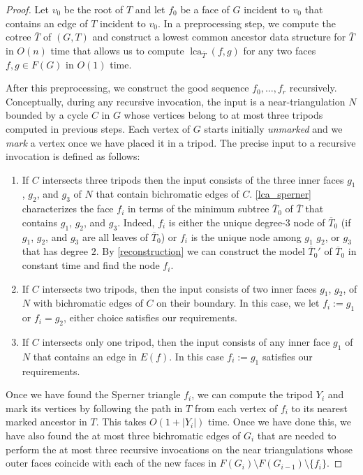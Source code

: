 \documentclass[a4paper,UKenglish,autoref]{lipics-v2021}
\DeclareMathOperator{\lca}{lca}
\begin{document}
\begin{proof}
  Let $v_0$ be the root of $T$ and let $f_0$ be a face of $G$ incident to $v_0$
  that contains an edge of $T$ incident to $v_0$.  In a preprocessing step, we compute the cotree $\overline{T}$ of $(G,T)$ and construct a lowest common ancestor data structure for $\overline{T}$ in $O(n)$ time that allows us to compute $\lca_{\overline{T}}(f,g)$ for any two faces $f,g\in F(G)$ in $O(1)$ time.

  After this preprocessing, we construct the good sequence $f_0,\ldots,f_{r}$ recursively. Conceptually, during any recursive invocation, the input is a near-triangulation $N$ bounded by a cycle $C$ in $G$ whose vertices belong to at most three tripods computed in previous steps.  Each vertex of $G$ starts initially \emph{unmarked} and we \emph{mark} a vertex once we have placed it in a tripod.  The precise input to a recursive invocation is defined as follows:
  \begin{enumerate}
    \item If $C$ intersects three tripods then the input consists of the three inner faces $g_1$, $g_2$, and $g_3$ of $N$ that contain bichromatic edges of $C$.  \cref{lca_sperner} characterizes the face $f_i$ in terms of the minimum subtree $\overline{T}_0$ of $\overline{T}$ that contains $g_1$, $g_2$, and $g_3$.  Indeed, $f_i$ is either the unique degree-$3$ node of $\overline{T}_0$ (if $g_1$, $g_2$, and $g_3$ are all leaves of $\overline{T}_0$) or $f_i$ is the unique node among $g_1$ $g_2$, or $g_3$ that has degree $2$.  By \cref{reconstruction} we can construct the model $\overline{T}_0'$ of $\overline{T}_0$ in constant time and find the node $f_i$.

    \item If $C$ intersects two tripods, then the input consists of two inner faces $g_1$, $g_2$, of $N$ with bichromatic edges of $C$ on their boundary.  In this case, we let $f_i:=g_1$ or $f_i=g_2$, either choice satisfies our requirements.

    \item If $C$ intersects only one tripod, then the input consists of any inner face $g_1$ of $N$ that contains an edge in $E(f)$.  In this case $f_i:=g_1$ satisfies our requirements.
\end{enumerate}
Once we have found the Sperner triangle $f_i$, we can compute the tripod $Y_i$ and mark its vertices by following the path in $T$ from each vertex of $f_i$ to its nearest marked ancestor in $T$.  This takes $O(1+|Y_i|)$ time.  Once we have done this, we have also found the at most three bichromatic edges of $G_i$ that are needed to perform the at most three recursive invocations on the near triangulations whose outer faces coincide with each of the new faces in $F(G_i)\setminus F(G_{i-1})\setminus\{f_i\}$.


\end{proof}
\end{document}
